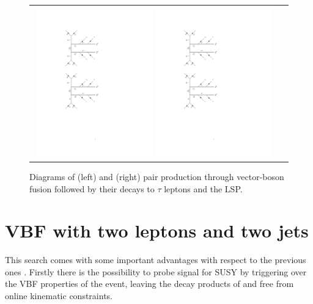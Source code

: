 \begin{figure}[tbh!]
	\centering
	\begin{tabular}{cc}
		\includegraphics[width=0.48\textwidth]{diagrams/pics/signal_C1N2.pdf}
		\includegraphics[width=0.48\textwidth]{diagrams/pics/signal_C1C1.pdf} 		
	\end{tabular}
	\caption{Diagrams of (left) \charginopm \neutralinotwo and (right) \charginopm \charginomp pair production through vector-boson fusion followed by their decays to $\tau$ leptons and the LSP.}
	\label{fig:VBF_diagrams}
\end{figure}

\section{VBF with two leptons and two jets}

This search comes with some important advantages with respect to the previous ones \cite{Dutta:2012xe}. Firstly there is the possibility to probe signal for SUSY by triggering over the VBF properties of the event, leaving the decay products of \charginopm and \neutralinotwo free from online kinematic constraints.


